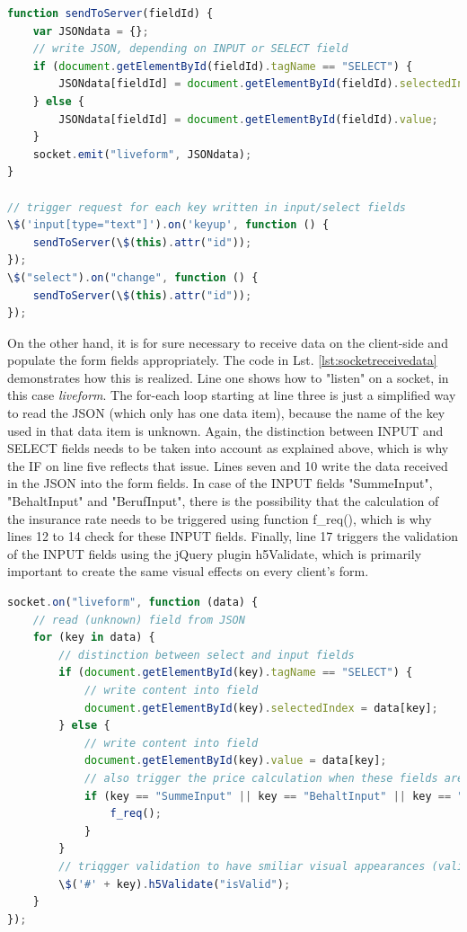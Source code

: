 \begin{lstlisting}[language=javascript,caption={Sending data to the server},label=lst:socketsenddata]
function sendToServer(fieldId) {
    var JSONdata = {};
    // write JSON, depending on INPUT or SELECT field
    if (document.getElementById(fieldId).tagName == "SELECT") {
        JSONdata[fieldId] = document.getElementById(fieldId).selectedIndex;
    } else {
        JSONdata[fieldId] = document.getElementById(fieldId).value;
    }
    socket.emit("liveform", JSONdata);
}

// trigger request for each key written in input/select fields
\$('input[type="text"]').on('keyup', function () {
    sendToServer(\$(this).attr("id"));
});
\$("select").on("change", function () {
    sendToServer(\$(this).attr("id"));
});
\end{lstlisting}

On the other hand, it is for sure necessary to receive data on the client-side and populate the form fields appropriately. The code in Lst. \ref{lst:socketreceivedata} demonstrates how this is realized. Line one shows how to "listen" on a socket, in this case \textit{liveform}. The for-each loop starting at line three is just a simplified way to read the JSON (which only has one data item), because the name of the key used in that data item is unknown. Again, the distinction between INPUT and SELECT fields needs to be taken into account as explained above, which is why the IF on line five reflects that issue. Lines seven and 10 write the data received in the JSON into the form fields. In case of the INPUT fields "SummeInput", "BehaltInput" and "BerufInput", there is the possibility that the calculation of the insurance rate needs to be triggered using function f\_req(), which is why lines 12 to 14 check for these INPUT fields. Finally, line 17 triggers the validation of the INPUT fields using the jQuery plugin h5Validate, which is primarily important to create the same visual effects on every client's form.

\begin{lstlisting}[language=javascript,caption={Receiving data using WebSockets},label=lst:socketreceivedata]
socket.on("liveform", function (data) {
    // read (unknown) field from JSON
    for (key in data) {
        // distinction between select and input fields
        if (document.getElementById(key).tagName == "SELECT") {
            // write content into field
            document.getElementById(key).selectedIndex = data[key];
        } else {
            // write content into field
            document.getElementById(key).value = data[key];
            // also trigger the price calculation when these fields are filled
            if (key == "SummeInput" || key == "BehaltInput" || key == "BerufInput") {
                f_req();
            }
        }
        // triqgger validation to have smiliar visual appearances (valid/invalid) for the fields
        \$('#' + key).h5Validate("isValid");
    }
});
\end{lstlisting}

